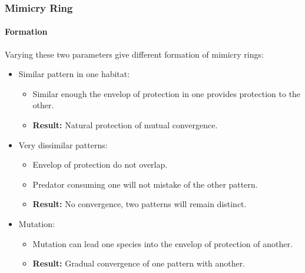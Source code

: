 \frame
{
	\frametitle{Mimicry Ring}
	\framesubtitle{Formation}

	Varying these two parameters give different formation of mimicry rings:
	\begin{itemize}
		\item Similar pattern in one habitat:
			\begin{itemize}
				\item Similar enough the envelop of protection in one provides protection to the other.
				\item \textbf{Result:} Natural protection of mutual convergence.
			\end{itemize}
		\item Very dissimilar patterns:
			\begin{itemize}
				\item Envelop of protection do not overlap. 
				\item Predator consuming one will not mistake of the other pattern.
				\item \textbf{Result:} No convergence, two patterns will remain distinct.
			\end{itemize}
		\item Mutation:
			\begin{itemize}
				\item Mutation can lead one species into the envelop of protection of another. 
				\item \textbf{Result:} Gradual convergence of one pattern with another.
			\end{itemize}
	\end{itemize}
}